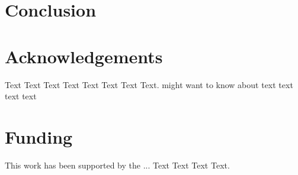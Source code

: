 \documentclass{bioinfo}
\begin{document}
\section{Conclusion}

\section*{Acknowledgements}

Text Text Text Text Text Text  Text Text.  \citealp{Boffelli03} might want to know about  text
text text text\vspace*{-12pt}




\section*{Funding}

This work has been supported by the ... Text Text  Text Text. \vspace*{-12pt}



\end{document}
